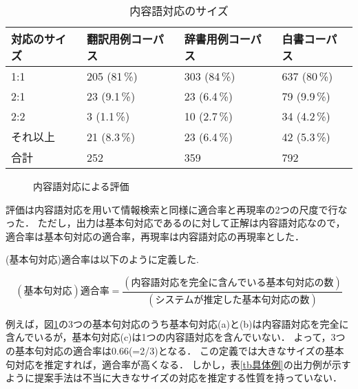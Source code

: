 	\begin{table}
	\begin{center}
	\begin{tabular}{llll}
	\hline
		対応のサイズ	&	翻訳用例コーパス	&辞書用例コーパス	&		白書コーパス		\\
	\hline                  
		1:1	&	205 (81\,\%)		&303 (84\,\%)		&		637 (80\,\%)		\\
		2:1	&	23 (9.1\,\%)		&23 (6.4\,\%)		&		79 (9.9\,\%)		\\
		2:2	&	3 (1.1\,\%)		&10 (2.7\,\%)		&		34 (4.2\,\%)		\\
		それ以上&	21 (8.3\,\%)		&23 (6.4\,\%)		&		42 (5.3\,\%)		\\
	\hline                  
		合計	&	252			&359			&		792			\\
	\hline

	\end{tabular}
	\caption{内容語対応のサイズ}
	\label{tb正解サイズ}
	\end{center}
	\end{table}



	\begin{figure}
	\begin{center}
	 \leavevmode
	 \epsfxsize=11cm
	 \epsfysize=2.2cm
	\end{center}
	\caption{内容語対応による評価}
	\label{評価}
	\end{figure}

評価は内容語対応を用いて情報検索と同様に適合率と再現率の2つの尺度で行なった．
ただし，出力は基本句対応であるのに対して正解は内容語対応なので，適合率は基本句対応の適合率，再現率は内容語対応の再現率とした．

\vspace{1ex}
\vspace{1ex}

(基本句対応)適合率は以下のように定義した.

\[
	(基本句対応)適合率 = \frac{ (内容語対応を完全に含んでいる基本句対応の数) }{ (システムが推定した基本句対応の数) }
\]

例えば，図\ref{評価}の3つの基本句対応のうち基本句対応(a)と(b)は内容語対応を完全に含んでいるが，基本句対応(c)は1つの内容語対応を含んでいない．
よって，3つの基本句対応の適合率は0.66(=2/3)となる．
この定義では大きなサイズの基本句対応を推定すれば，適合率が高くなる．
しかし，表\ref{tb具体例}の出力例が示すように提案手法は不当に大きなサイズの対応を推定する性質を持っていない．

\vspace{1ex}
\vspace{1ex}

